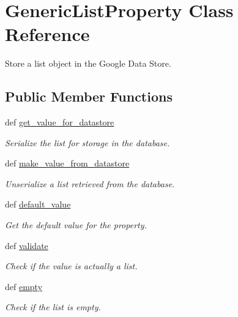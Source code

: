 \hypertarget{classbackend_1_1_generic_list_property}{
\section{GenericListProperty Class Reference}
\label{classbackend_1_1_generic_list_property}
}


Store a list object in the Google Data Store.  
\subsection*{Public Member Functions}
\begin{DoxyCompactItemize}
\item 
def \hyperlink{classbackend_1_1_generic_list_property_a54cc138e6df3ad55c38fa5db72327963}{get\_\-value\_\-for\_\-datastore}
\begin{DoxyCompactList}\small\item\em Serialize the list for storage in the database. \item\end{DoxyCompactList}\item 
def \hyperlink{classbackend_1_1_generic_list_property_a464c5a5f52df989128b5fc067ea34512}{make\_\-value\_\-from\_\-datastore}
\begin{DoxyCompactList}\small\item\em Unserialize a list retrieved from the database. \item\end{DoxyCompactList}\item 
def \hyperlink{classbackend_1_1_generic_list_property_a64bfffc058d933b3b0599f5bc7c049d1}{default\_\-value}
\begin{DoxyCompactList}\small\item\em Get the default value for the property. \item\end{DoxyCompactList}\item 
def \hyperlink{classbackend_1_1_generic_list_property_a8f3dc5c8aaf85c281c2f52cda259aa56}{validate}
\begin{DoxyCompactList}\small\item\em Check if the value is actually a list. \item\end{DoxyCompactList}\item 
def \hyperlink{classbackend_1_1_generic_list_property_aad7084fad37d1cf9b41a738ecfbbd249}{empty}
\begin{DoxyCompactList}\small\item\em Check if the list is empty. \item\end{DoxyCompactList}\end{DoxyCompactItemize}
